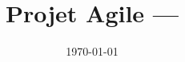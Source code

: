 \usepackage{ifthen}

\newsavebox{\fmbox}
\newenvironment{fmpage}[1]
     {\begin{lrbox}{\fmbox}\begin{minipage}{#1}}
	  {\end{minipage}\end{lrbox}\fbox{\usebox{\fmbox}}}


\makeatletter

\title{Projet Agile --- }

\def\top#1{\def\@top{#1}}

\def\sousTitre#1{\def\@sousTitre{#1}}
\sousTitre{Rubidium}

\def\location#1{\def\@location{#1}}
\location{Toulouse}

\date{\today}

\def\clap#1{
	\hbox to 0pt{\hss #1\hss}
}%
\def\ligne#1{%
	\hbox to \hsize{%
		\vbox{\centering #1}
	}
}%

\def\haut#1#2#3{%
	\hbox to \hsize{%
		\rlap{
			\vtop{\raggedright #1}
		}%
		\hss
		\clap{	
			\vtop{\centering #2}
		}%
		\hss
		\llap{
			\vtop{\raggedleft #3}
		}
	}
}%

\def\bas#1#2#3{%
	\hbox to \hsize{%
	\hss \clap{\vbox{
	\centering \hspace{1.7cm}\newline
		\newline \newline \newline	\newline \newline \newline	\newline \newline \newline	\newline \newline \newline	\newline \newline \newline	\newline \newline \newline\newline #2 }
		}%
		\hss
	}
}%

